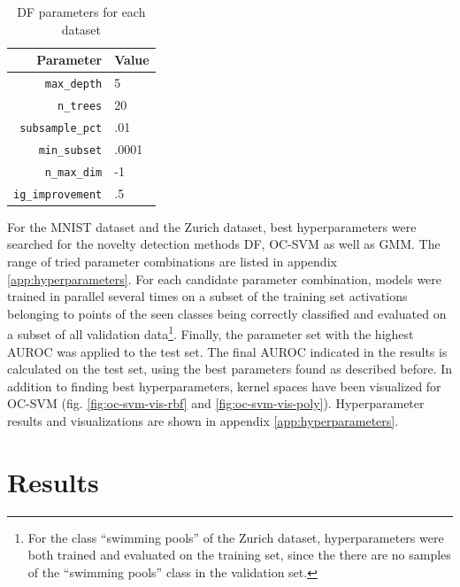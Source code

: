 \documentclass[10pt]{article}
\begin{document}
\begin{table}[H]
    \centering
    \small
    \begin{tabular}{rl}
        \toprule
        Parameter & Value \\ \midrule
        \texttt{max\_depth} & 5 \\
        \texttt{n\_trees} & 20  \\
        \texttt{subsample\_pct} & .01  \\
        \texttt{min\_subset} & .0001 \\
        \texttt{n\_max\_dim} & -1 \\
        \texttt{ig\_improvement} & .5 \\\bottomrule
    \end{tabular}
    \caption{\acrlong{DF} parameters for each dataset}
    \label{table:synthetic-parameters}
\end{table}

For the \gls{MNIST} dataset and the Zurich dataset, best hyperparameters were searched for the novelty detection methods \acrlong{DF}, \gls{OC-SVM} as well as \gls{GMM}. The range of tried parameter combinations are listed in appendix \ref{app:hyperparameters}. For each candidate parameter combination, models were trained in parallel several times on a subset of the training set activations belonging to points of the seen classes being correctly classified and evaluated on a subset of all validation data\footnote{For the class ``swimming pools'' of the Zurich dataset, hyperparameters were both trained and evaluated on the training set, since the there are no samples of the ``swimming pools'' class in the validation set.}. Finally, the parameter set with the highest \gls{AUROC} was applied to the test set. The final AUROC indicated in the results is calculated on the test set, using the best parameters found as described before. In addition to finding best hyperparameters, kernel spaces have been visualized for \gls{OC-SVM}  (fig. \ref{fig:oc-svm-vis-rbf} and \ref{fig:oc-svm-vis-poly}). Hyperparameter results and visualizations are shown in appendix \ref{app:hyperparameters}.


\section{Results}
\label{sec:results}
\end{document}
